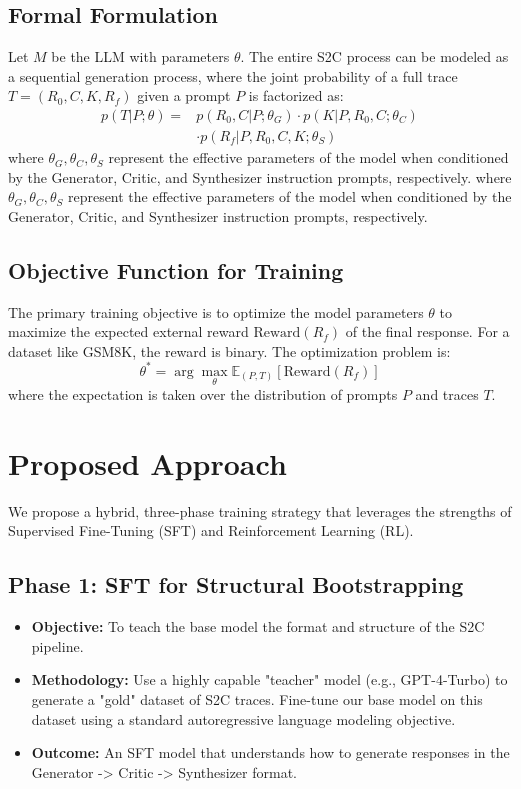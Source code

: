 \documentclass[conference]{IEEEtran}
\begin{document}
\subsection{Formal Formulation}
Let $M$ be the LLM with parameters $\theta$. The entire S2C process can be modeled as a sequential generation process, where the joint probability of a full trace $T = (R_0, C, K, R_f)$ given a prompt $P$ is factorized as:
\begin{equation}
\begin{split}
    p(T | P; \theta) ={}& p(R_0, C | P; \theta_G) \cdot p(K | P, R_0, C; \theta_C) \\
    & \cdot p(R_f | P, R_0, C, K; \theta_S)
\end{split}
\end{equation}
where $\theta_G, \theta_C, \theta_S$ represent the effective parameters of the model when conditioned by the Generator, Critic, and Synthesizer instruction prompts, respectively.
where $\theta_G, \theta_C, \theta_S$ represent the effective parameters of the model when conditioned by the Generator, Critic, and Synthesizer instruction prompts, respectively.

\subsection{Objective Function for Training}
The primary training objective is to optimize the model parameters $\theta$ to maximize the expected external reward $\text{Reward}(R_f)$ of the final response. For a dataset like GSM8K, the reward is binary. The optimization problem is:
\begin{equation}
\theta^* = \arg\max_\theta \mathbb{E}_{(P, T)} [\text{Reward}(R_f)]
\end{equation}
where the expectation is taken over the distribution of prompts $P$ and traces $T$.

\section{Proposed Approach}
We propose a hybrid, three-phase training strategy that leverages the strengths of Supervised Fine-Tuning (SFT) and Reinforcement Learning (RL).

\subsection{Phase 1: SFT for Structural Bootstrapping}
\begin{itemize}
    \item \textbf{Objective:} To teach the base model the format and structure of the S2C pipeline.
    \item \textbf{Methodology:} Use a highly capable "teacher" model (e.g., GPT-4-Turbo) to generate a "gold" dataset of S2C traces. Fine-tune our base model on this dataset using a standard autoregressive language modeling objective.
    \item \textbf{Outcome:} An SFT model that understands how to generate responses in the Generator -> Critic -> Synthesizer format.
\end{itemize}
\end{document}
